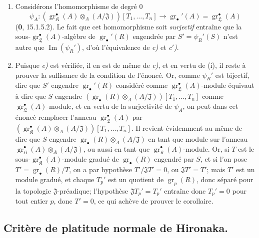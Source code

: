 \begin{enumerate}
  \item[(i)] Considérons l'homomorphisme de degré $0$
  \[
    \psi_A:(\operatorname{gr}_{\mathfrak K}^\bullet(A)\otimes_A(A/\mathfrak J))[T_1,\ldots,T_n]\longrightarrow\operatorname{gr}_\bullet'(A)=\operatorname{gr}_{\mathfrak L}^\bullet(A)
  \]
  (\textbf{0}, 15.1.5.2). Le fait que cet homomorphisme soit \emph{surjectif} entraîne que la sous-$\operatorname{gr}_{\mathfrak L}^\bullet(A)$-algèbre de $\operatorname{gr}_\bullet'(R)$ engendrée par $S'=\psi_R'(S)$ n'est autre que $\operatorname{Im}(\psi_R')$, d'où l'équivalence de \emph{c)} et \emph{c$'$)}.
  \item[(ii)] Puisque \emph{e)} est vérifiée, il en est de même de \emph{c)}, et en vertu de (i), il reste à prouver la suffisance de la condition de l'énoncé. Or, comme $\psi_R'$ est bijectif, dire que $S'$ engendre $\operatorname{gr}_\bullet'(R)$ considéré comme $\operatorname{gr}_{\mathfrak L}^\bullet(A)$-module équivaut à dire que $S$ engendre $(\operatorname{gr}_\bullet(R)\otimes_A(A/\mathfrak J))[T_1,\ldots,T_n]$ comme $\operatorname{gr}_{\mathfrak L}^\bullet(A)$-module, et en vertu de la surjectivité de $\psi_A$, on peut dans cet énoncé remplacer l'anneau $\operatorname{gr}_{\mathfrak L}^\bullet(A)$ par $(\operatorname{gr}_{\mathfrak K}^\bullet(A)\otimes_A(A/\mathfrak J))[T_1,\ldots,T_n]$. Il revient évidemment au même de dire que $S$ engendre $\operatorname{gr}_\bullet(R)\otimes_A(A/\mathfrak J)$ en tant que module sur l'anneau $\operatorname{gr}_{\mathfrak K}^\bullet(A)\otimes_A(A/\mathfrak J)$, ou aussi en tant que $\operatorname{gr}_{\mathfrak K}^\bullet(A)$-module. Or, si $T$ est le sous-$\operatorname{gr}_{\mathfrak K}^\bullet(A)$-module gradué de $\operatorname{gr}_\bullet(R)$ engendré par $S$, et si l'on pose $T'=\operatorname{gr}_\bullet(R)/T$, on a par hypothèse $T'/\mathfrak JT'=0$, ou $\mathfrak JT'=T'$; mais $T'$ est un module gradué, et chaque $T_p'$ est un quotient de $\operatorname{gr}_p(R)$, donc séparé pour la topologie $\mathfrak J$-préadique; l'hypothèse $\mathfrak JT_p'=T_p'$ entraîne donc $T_p'=0$ pour tout entier $p$, donc $T'=0$, ce qui achève de prouver le corollaire.
\end{enumerate}

\subsection{Critère de platitude normale de Hironaka.}
\label{IV.19.7}

